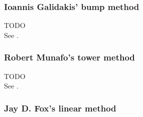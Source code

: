 \documentclass[12pt]{article}
\theoremstyle{definition}
\newcommand{\N}{\mathbb{N}}
\newcommand{\R}{\mathbb{R}}
\newcommand{\mt}[1]{\quad\mbox{#1}\quad}
\newcommand{\tet}[2]{{{}^{#2}{#1}}}
\newcommand{\tlog}[2]{\tlogs_{#1}(#2)}
\DeclareMathOperator{\tlogs}{tlog}
\begin{document}
\subsubsection{Ioannis Galidakis' bump method}
TODO\\
See \cite{Galidakis:Hyper4}.
\subsubsection{Robert Munafo's tower method}
TODO\\
See \cite{Munafo:Hyper4}.

\subsubsection{Jay D. Fox's linear method}


\end{document}
